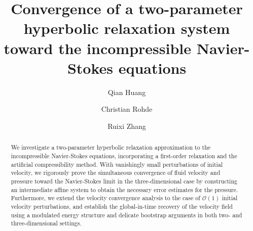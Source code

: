 \documentclass[reqno,10pt]{amsart}
\theoremstyle{definition}
\theoremstyle{remark}
\numberwithin{equation}{section}
\begin{document}
\title[Two-parameter relaxation of the incompressible Navier-Stokes equations]{Convergence of a two-parameter hyperbolic relaxation system toward the incompressible Navier-Stokes equations}



\author[Qian Huang]{Qian Huang}
\address{Institute of Applied Analysis and Numerical Simulation, University of Stuttgart, 70569 Stuttgart, Germany}

\author[Christian Rohde]{Christian Rohde}
\address{Institute of Applied Analysis and Numerical Simulation, University of Stuttgart, 70569 Stuttgart, Germany}

\author[Ruixi Zhang]{Ruixi Zhang}
\address{Department of Mathematical Sciences, Tsinghua University, Beijing 100084, China}



\date{}

\dedicatory{}

\begin{abstract}
We investigate a two-parameter hyperbolic relaxation approximation to the incompressible Navier-Stokes equations, incorporating a first-order relaxation and the artificial compressibility method. With vanishingly small perturbations of initial velocity, we rigorously prove the simultaneous convergence of fluid velocity and pressure toward the Navier-Stokes limit in the three-dimensional case by constructing an intermediate affine system to obtain the necessary error estimates for the pressure. Furthermore, we extend the velocity convergence analysis to the case of $\mathcal O(1)$ initial velocity perturbations, and establish the global-in-time recovery of the velocity field using a modulated energy structure and delicate bootstrap arguments in both two- and three-dimensional settings.
\end{abstract}
\end{document}
